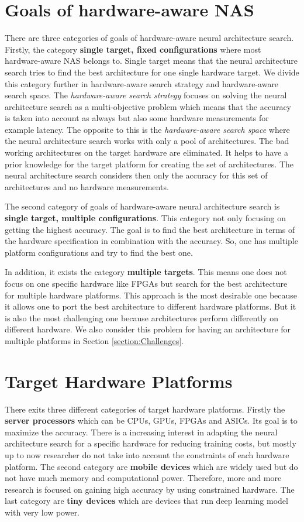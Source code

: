 \documentclass[conference]{IEEEtran}
\begin{document}
\section{Goals of hardware-aware NAS}
\label{section:Goals}
There are three categories of goals of hardware-aware neural architecture search. Firstly, the category \textbf{single target, fixed configurations} where most hardware-aware NAS belongs to. Single target means that the neural architecture search tries to find the best architecture for one single hardware target. We divide this category further in hardware-aware search strategy and hardware-aware search space. The \textit{hardware-aware search strategy} focuses on solving the neural architecture search as a multi-objective problem which means that the accuracy is taken into account as always but also some hardware measurements for example latency. The opposite to this is the \textit{hardware-aware search space} where the neural architecture search works with only a pool of architectures. The bad working architectures on the target hardware are eliminated. It helps to have a prior knowledge for the target platform for creating the set of architectures. The neural architecture search considers then only the accuracy for this set of architectures and no hardware measurements.

The second category of goals of hardware-aware neural architecture search is \textbf{single target, multiple configurations}. This category not only focusing on getting the highest accuracy. The goal is to find the best architecture in terms of the hardware specification in combination with the accuracy. So, one has multiple platform configurations and try to find the best one. 

In addition, it exists the category \textbf{multiple targets}. This means one does not focus on one specific hardware like FPGAs but search for the best architecture for multiple hardware platforms. This approach is the most desirable one because it allows one to port the best architecture to different hardware platforms. But it is also the most challenging one because architectures perform differently on different hardware. We also consider this problem for having an architecture for multiple platforms in Section \ref{section:Challenges}.

\section{Target Hardware Platforms}
\label{section:HWPlatforms}
There exits three different categories of target hardware platforms. Firstly the \textbf{server processors} which can be CPUs, GPUs, FPGAs and ASICs. Its goal is to maximize the accuracy. There is a increasing interest in adapting the neural architecture search for a specific hardware for reducing training costs, but mostly up to now researcher do not take into account the constraints of each hardware platform. The second category are \textbf{mobile devices} which are widely used but do not have much memory and computational power. Therefore, more and more research is focused on gaining high accuracy by using constrained hardware. The last category are \textbf{tiny devices} which are devices that run deep learning model with very low power. 
\end{document}
